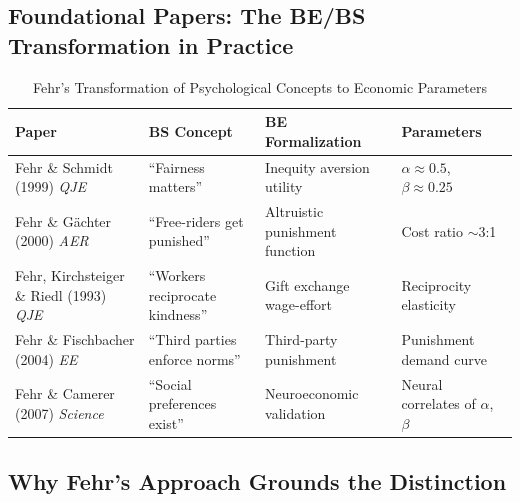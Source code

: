 \documentclass[11pt, a4paper]{article}
\begin{document}
\subsection{Foundational Papers: The BE/BS Transformation in Practice}

\begin{table}[htbp]
\centering
\caption{Fehr's Transformation of Psychological Concepts to Economic Parameters}
\label{tab:evd-fehr-papers}
\renewcommand{\arraystretch}{1.4}
\begin{tabular}{@{}p{3.5cm}p{3cm}p{4cm}p{3cm}@{}}
\toprule
\textbf{Paper} & \textbf{BS Concept} & \textbf{BE Formalization} & \textbf{Parameters} \\
\midrule
Fehr \& Schmidt (1999) \textit{QJE} & ``Fairness matters'' & Inequity aversion utility & $\alpha \approx 0.5$, $\beta \approx 0.25$ \\
\addlinespace
Fehr \& Gächter (2000) \textit{AER} & ``Free-riders get punished'' & Altruistic punishment function & Cost ratio $\sim$3:1 \\
\addlinespace
Fehr, Kirchsteiger \& Riedl (1993) \textit{QJE} & ``Workers reciprocate kindness'' & Gift exchange wage-effort & Reciprocity elasticity \\
\addlinespace
Fehr \& Fischbacher (2004) \textit{EE} & ``Third parties enforce norms'' & Third-party punishment & Punishment demand curve \\
\addlinespace
Fehr \& Camerer (2007) \textit{Science} & ``Social preferences exist'' & Neuroeconomic validation & Neural correlates of $\alpha$, $\beta$ \\
\bottomrule
\end{tabular}
\end{table}

\subsection{Why Fehr's Approach Grounds the Distinction}
\end{document}

